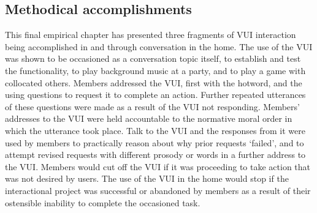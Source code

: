 \subsection{Methodical accomplishments}\label{sec:empirical home summary methods}
\begin{revisedsubmission}
This final empirical chapter has presented three fragments of \ac{VUI} interaction being accomplished in and through conversation in the home.
The use of the \ac{VUI} was shown to be occasioned as a conversation topic itself, to establish and test the functionality, to play background music at a party, and to play a game with collocated others.
Members addressed the \ac{VUI}, first with the hotword, and the using questions to request it to complete an action.
Further repeated utterances of these questions were made as a result of the \ac{VUI} not responding.
Members' addresses to the \ac{VUI} were held accountable to the normative moral order in which the utterance took place.
Talk to the \ac{VUI} and the responses from it were used by members to practically reason about why prior requests `failed', and to attempt revised requests with different prosody or words in a further address to the \ac{VUI}.
Members would cut off the \ac{VUI} if it was proceeding to take action that was not desired by users.
The use of the \ac{VUI} in the home would stop if the interactional project was successful or abandoned by members as a result of their ostensible inability to complete the occasioned task.
\end{revisedsubmission}



